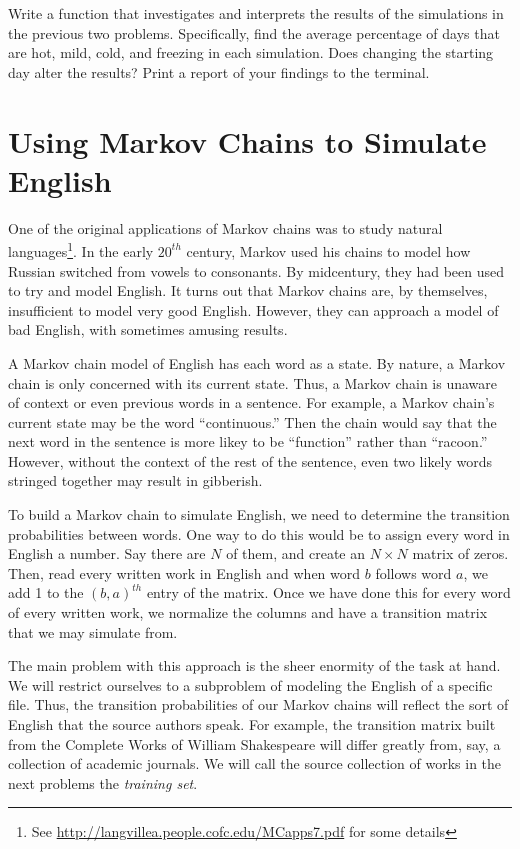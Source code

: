 \begin{problem}
Write a function that investigates and interprets the results of the simulations in the previous two problems.
Specifically, find the average percentage of days that are hot, mild, cold, and freezing in each simulation.
Does changing the starting day alter the results?
Print a report of your findings to the terminal.
\end{problem}

\section*{Using Markov Chains to Simulate English}
One of the original applications of Markov chains was to study natural languages\footnote{See \url{http://langvillea.people.cofc.edu/MCapps7.pdf} for some details}.
In the early $20^{th}$ century, Markov used his chains to model how Russian switched from vowels to consonants.
By midcentury, they had been used to try and model English.
It turns out that Markov chains are, by themselves, insufficient to model very good English.
However, they can approach a model of bad English, with sometimes amusing results.

A Markov chain model of English has each word as a state.
By nature, a Markov chain is only concerned with its current state.
Thus, a Markov chain is unaware of context or even previous words in a sentence.
For example, a Markov chain's current state may be the word ``continuous.''
Then the chain would say that the next word in the sentence is more likey to be ``function'' rather than ``racoon.''
However, without the context of the rest of the sentence, even two likely words stringed together may result in gibberish.

To build a Markov chain to simulate English, we need to determine the transition probabilities between words.
One way to do this would be to assign every word in English a number.
Say there are $N$ of them, and create an $N\times N$ matrix of zeros.
Then, read every written work in English and when word $b$ follows word $a$, we add 1 to the $(b,a)^{th}$ entry of the matrix.
Once we have done this for every word of every written work, we normalize the columns and have a transition matrix that we may simulate from.

The main problem with this approach is the sheer enormity of the task at hand.
We will restrict ourselves to a subproblem of modeling the English of a specific file.
Thus, the transition probabilities of our Markov chains will reflect the sort of English that the source authors speak.
For example, the transition matrix built from the Complete Works of William Shakespeare will differ greatly from, say, a collection of academic journals.
We will call the source collection of works in the next problems the \emph{training set}.

